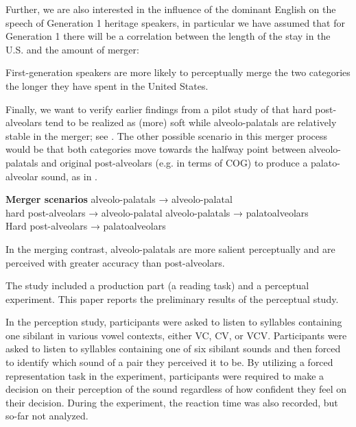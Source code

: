 \documentclass[output=paper,modfonts,newtxmath,hidelinks,]{langscibook}
\begin{document}
Further, we are also interested in the influence of the dominant English on the speech of Generation 1 heritage speakers, in particular we have assumed that for Generation 1 there will be a correlation between the length of the stay in the U.S. and the amount of merger:


\begin{exe}
  First-generation speakers are more likely to perceptually merge   the two categories the longer they have spent in the United   States.
\end{exe}


Finally, we want to verify earlier findings from a pilot study of \citet{Cavar-etal2016} that hard post-alveolars tend to be realized as (more) soft while alveolo-palatals are relatively stable in the merger; see . The other possible scenario in this merger process would be that both categories move towards the halfway point between alveolo-palatals and original post-alveolars (e.g. in terms of COG) to produce a palato-alveolar sound, as in .

\ea\textbf{Merger scenarios}
   \ea\label{ex:mihajlovic:1a}
alveolo-palatals      → alveolo-palatal\\
        hard post-alveolars → alveolo-palatal
\ex\label{ex:mihajlovic:1b}  alveolo-palatals       → palatoalveolars\\
        Hard post-alveolars → palatoalveolars
\z
\z

\begin{exe}
  In the merging contrast, alveolo-palatals are more salient perceptually and are perceived with greater accuracy than post-alveolars.
\end{exe}

The study included a production part (a reading task) and a perceptual experiment. This paper reports the preliminary results of the perceptual study.

In the perception study, participants were asked to listen to syllables containing one sibilant in various vowel contexts, either VC, CV, or VCV. Participants were asked to listen to syllables containing one of six sibilant sounds and then forced to identify which sound of a pair they perceived it to be. By utilizing a forced representation task in the experiment, participants were required to make a decision on their perception of the sound regardless of how confident they feel on their decision. During the experiment, the reaction time was also recorded, but so-far not analyzed.
\end{document}
